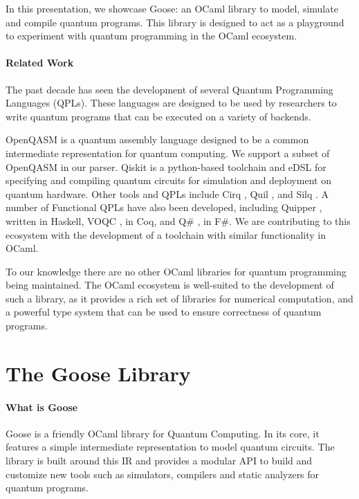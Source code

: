 \documentclass[a4paper]{easychair}
\begin{document}
In this presentation, we showcase Goose: an OCaml library to model, simulate and compile quantum programs. This library is designed to act as a playground to experiment with quantum programming in the OCaml ecosystem.

\paragraph*{Related Work}

The past decade has seen the development of several Quantum Programming Languages (QPLs). These languages are designed to be used by researchers to write quantum programs that can be executed on a variety of backends. 

OpenQASM \cite{Cross2022} is a quantum assembly language designed to be a common intermediate representation for quantum computing.  We support a subset of OpenQASM in our parser. Qiskit \cite{Qiskit} is a python-based toolchain and eDSL for specifying and compiling quantum circuits for simulation and deployment on quantum hardware. Other tools and QPLs include Cirq \cite{Cirq2018}, Quil \cite{Quil2016}, and Silq \cite{Bichsel2020}. A number of Functional QPLs have also been developed, including Quipper \cite{Green2013}, written in Haskell, VOQC \cite{Hietala2021}, in Coq, and Q\# \cite{Svore2018}, in F\#. We are contributing to this ecosystem with the development of a toolchain with similar functionality in OCaml.

To our knowledge there are no other OCaml libraries for quantum programming being maintained. The OCaml ecosystem is well-suited to the development of such a library, as it provides a rich set of libraries for numerical computation, and a powerful type system that can be used to ensure correctness of quantum programs.

\section{The Goose Library}

\paragraph*{What is Goose} Goose is a friendly OCaml library for Quantum Computing. In its core, it features a simple intermediate representation to model quantum circuits. The library is built around this IR and provides a modular API to build and customize new tools such as simulators, compilers and static analyzers for quantum programs.
\end{document}
